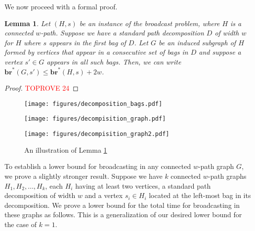\documentclass[letterpaper,11pt]{article}
\newtheorem{lemma}[theorem]{Lemma}
\newcommand{\bropt}{{\boldsymbol{br}^*}}
\newcommand{\pwidth}{w}
\begin{document}
We now proceed with a formal proof.

\begin{lemma}\label{lemma:br:inducedHG}
    Let $(H,s)$ be an instance of the broadcast problem, where $H$ is a connected $\pwidth$-path. Suppose we have a standard path decomposition $D$ of width $\pwidth$ for $H$ where $s$ appears in the first bag of $D$. Let $G$ be an induced subgraph of $H$ formed by vertices that appear in a consecutive set of bags in $D$ and suppose a vertex $s'\in G$ appears in all such bags. Then, we can write $\bropt(G,s') \leq \bropt(H,s)+2\pwidth$.
\end{lemma}
    
\begin{proof}\textcolor{red}{TOPROVE 24}\end{proof}

\begin{figure}
    \centering
    \begin{minipage}[b]{0.5\textwidth}
        \centering
        \texttt{[image: figures/decomposition\_bags.pdf]}  \label{fig:decomposition_bags}
        
    \end{minipage}
    \hfill
    \begin{minipage}[b]{0.2\textwidth} \centering
        \texttt{[image: figures/decompisition\_graph.pdf]}  \label{fig:decomposition_graph}
    \end{minipage}
    \hfill
    \begin{minipage}[b]{0.25\textwidth} \centering
        \texttt{[image: figures/decompisition\_graph2.pdf]}  \label{fig:decomposition_graph2}
    \end{minipage}
    \caption{An illustration of Lemma \ref{lemma:br:inducedHG}}
    \label{fig:decomposition_bag_graphs}
\end{figure}

To establish a lower bound for broadcasting in any connected $\pwidth$-path graph $G$, we prove a slightly stronger result. Suppose we have $k$ connected $\pwidth$-path graphs $H_1, H_2,\ldots, H_k$, each $H_i$ having at least two vertices, a standard path decomposition of width  $\pwidth$ and a vertex $s_i \in H_i$ located at the left-most bag in its decomposition. We prove a lower bound for the total time for broadcasting in these graphs as follows. This is a generalization of our desired lower bound for the case of $k=1$.
\end{document}
